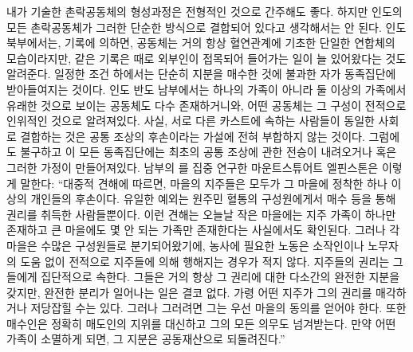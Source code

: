 내가 기술한 촌락공동체의 형성과정은 전형적인 것으로 간주해도 좋다.
하지만
인도의 모든 촌락공동체가
그러한 단순한 방식으로 결합되어 있다고 생각해서는 안 된다.
인도 북부에서는,
기록에 의하면,
공동체는
거의 항상
혈연관계에 기초한 단일한 연합체의 모습이라지만,
같은 기록은
때로 외부인이 접목되어 들어가는 일이 늘 있어왔다는 것도
알려준다.
일정한 조건 하에서는
단순히 지분을 매수한 것에 불과한 자가 동족집단에 받아들여지는 것이다.
인도 반도 남부에서는
하나의 가족이 아니라 둘 이상의 가족에서 유래한 것으로 보이는
공동체도 다수 존재하거니와,
어떤 공동체는 그 구성이 전적으로 인위적인 것으로 알려져있다.
사실,
서로 다른 카스트에 속하는 사람들이
동일한 사회로
결합하는 것은
공통 조상의 후손이라는 가설에 전혀 부합하지 않는 것이다.
그럼에도 불구하고 이 모든 동족집단에는
최초의 공통 조상에 관한 전승이 내려오거나
혹은 그러한 가정이 만들어져있다.
남부의 를 집중 연구한
마운트스튜어트 엘핀스톤은
이렇게 말한다:
``대중적 견해에 따르면,
마을의 지주들은 모두가 그 마을에 정착한 하나 이상의 개인들의 후손이다.
유일한 예외는 원주민 혈통의 구성원에게서 매수 등을 통해
권리를 취득한 사람들뿐이다.
이런 견해는
오늘날
작은 마을에는 지주 가족이 하나만 존재하고
큰 마을에도 몇 안 되는 가족만 존재한다는
사실에서도 확인된다.
그러나 각 마을은 수많은 구성원들로 분기되어왔기에,
농사에 필요한 노동은
소작인이나 노무자의 도움 없이
전적으로 지주들에 의해 행해지는 경우가 적지 않다.
지주들의 권리는 그들에게 집단적으로 속한다.
그들은 거의 항상 그 권리에 대한 다소간의 완전한 지분을 갖지만,
완전한 분리가 일어나는 일은 결코 없다.
가령 어떤 지주가 그의 권리를 매각하거나 저당잡힐 수는 있다.
그러나 그러려면 그는 우선 마을의 동의를 얻어야 한다.
또한 매수인은 정확히 매도인의 지위를 대신하고 그의 모든 의무도 넘겨받는다.
만약 어떤 가족이 소멸하게 되면, 그 지분은 공동재산으로 되돌려진다.''

